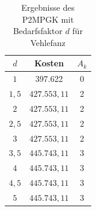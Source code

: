 \documentclass[11pt,a4paper]{article}
\theoremstyle{my_th_style1}
\begin{document}
\begin{table}[h]
	\centering
	\begin{tabular}{c|c|c}
		\centering
		$d$ & Kosten & $A_k$ \\	
		\hline
		$1$   	 &  397.622 & 0  \\
		$1,5$ 	&   $427.553,11$  & 2  \\
		$2$   	&   $427.553,11$ & 2  \\
		$2,5$   	&   $427.553,11$ & 2  \\
		$3$    &   $427.553,11$ & 2  \\
		$3,5$   	&   $445.743,11$ & 3  \\
		$4$   	&   $445.743,11$& 3  \\
		$4,5$    & $445.743,11$ & 3 \\
		$5$   	&   $445.743,11$& 3  \\	
	\end{tabular}
	\label{P2PGKBedarfV}
	\caption{Ergebnisse des P2MPGK mit Bedarfsfaktor $d$ f\"ur Vehlefanz} 
\end{table}


\thispagestyle{empty}
\end{document}
